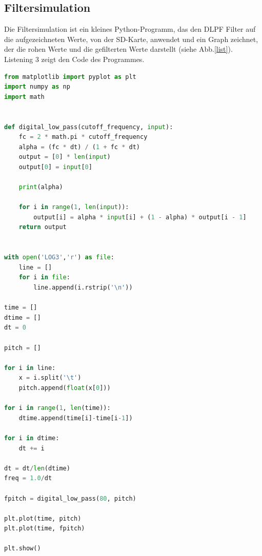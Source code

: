 \documentclass[12pt,a4paper, ngerman]{article}
\begin{document}
\subsection{Filtersimulation}
Die Filtersimulation ist ein kleines Python-Programm, das den DLPF Filter auf die aufgezeichneten Werte, von der SD-Karte, anwendet und ein Graph zeichnet, der die rohen Werte und die gefilterten Werte darstellt (siehe Abb.\ref{list}). Listening 3 zeigt den Code des Programmes. 
\begin{lstlisting}[language=Python,caption=Filtersimulation]
from matplotlib import pyplot as plt
import numpy as np
import math


def digital_low_pass(cutoff_frequency, input):
    fc = 2 * math.pi * cutoff_frequency
    alpha = (fc * dt) / (1 + fc * dt)
    output = [0] * len(input)
    output[0] = input[0]

    print(alpha)

    for i in range(1, len(input)):
        output[i] = alpha * input[i] + (1 - alpha) * output[i - 1]
    return output


with open('LOG3','r') as file:
    line = []
    for i in file:
        line.append(i.rstrip('\n'))

time = []
dtime = []
dt = 0

pitch = []

for i in line:
    x = i.split('\t')
    pitch.append(float(x[0]))

for i in range(1, len(time)):
    dtime.append(time[i]-time[i-1])

for i in dtime:
    dt += i

dt = dt/len(dtime)
freq = 1.0/dt

fpitch = digital_low_pass(80, pitch)

plt.plot(time, pitch)
plt.plot(time, fpitch)

plt.show()
\end{lstlisting}
\newpage
\end{document}
